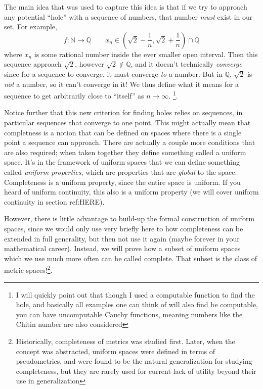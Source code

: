 \documentclass{book}
\newcommand{\N}{{\mathbb{N}}}
\newcommand{\Q}{{\mathbb{Q}}}
\newcommand{\rw}{\rightarrow}
\begin{document}
The main idea that was used to capture this idea is that if we try to approach any potential ``hole'' with a sequence of
numbers, that number \emph{must} exist in our set. For example,
\[
	f: \N \rw \Q \qquad x_n \in (\sqrt{2} - \frac{1}{n}, \sqrt{2} + \frac{1}{n})\cap \Q
\]
where $x_n$ is some rational number inside the ever smaller open interval. Then this sequence approach $\sqrt{2}$,
however $\sqrt{2} \notin \Q$, and it doesn't technically \emph{converge} since for a sequence to converge, it must
converge \emph{to} a number. But in $\Q$, $\sqrt{2}$ is \emph{not} a number, so it can't converge in it! We thus define
what it means for a sequence to get arbitrarily close to ``itself'' as $n \rw \infty$. \footnote{I will quickly point
out that though I used a computable function to find the hole, and basically all examples one can think of will also
find be computable, you can have uncomputable Cauchy functions, meaning numbers like the Chitin number are also
considered}.

Notice further that this new criterion for finding holes relies on sequences, in particular sequences that
converge to one point. This might actually mean that completness is a notion that can be defined on spaces where there
is a single point a sequence can approach. There are actually a couple more conditions that are also required; when
taken together they define something called a uniform space. It's in the framework of uniform spaces that we can define
something called \emph{uniform properties}, which are properties that are \emph{global} to the space. Completeness is
a uniform property, since the entire space is uniform. If you heard of uniform continuity, this also is a uniform
property (we will cover uniform continuity in section ref:HERE).

However, there is little advantage to build-up the formal construction of uniform spaces, since we would only use very
briefly here to how completeness can be extended in full generality, but then not use it again (maybe forever in your
mathematical career). Instead, we will prove how a subset of uniform spaces which we use much more often can be called
complete. That subset is the class of metric spaces!\footnote{Historically, completeness of metrics was studied first.
Later, when the concept was abstracted, uniform spaces were defined in terms of pseudometrics, and were found to be the
natural generalization for studying completeness, but they are rarely used for current lack of utility beyond their use
in generalization}.
\end{document}

